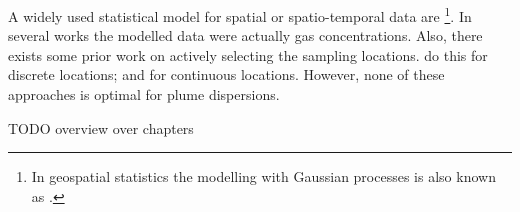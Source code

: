 A widely used statistical model for spatial or spatio-temporal data are 
\footnote{In geospatial statistics the modelling 
    with Gaussian processes is also known as .}. In several 
works \parencite[e.\,g.][]{Stachniss:2008vz, Marchant:2012wb} the modelled data 
were actually gas concentrations. Also, there exists some prior work on actively 
selecting the sampling locations. \Textcite{Stranders:2008wl} do this for 
discrete locations; \textcite{Singh:2010wt} and \textcite{Marchant:2012wb} for 
continuous locations. However, none of these approaches is optimal for plume 
dispersions.

TODO overview over chapters
